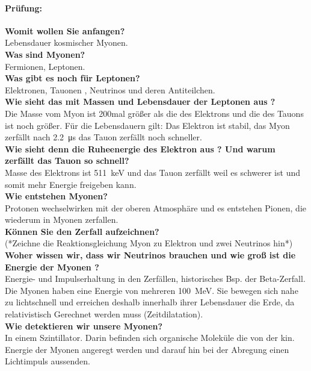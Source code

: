 \paragraph{Prüfung:} \quad \newline
\textbf{Womit wollen Sie anfangen?}\\
Lebensdauer kosmischer Myonen. \\
\textbf{Was sind Myonen?}\\
Fermionen, Leptonen. \\ 
\textbf{Was gibt es noch für Leptonen?}\\
Elektronen, Tauonen , Neutrinos und deren Antiteilchen. \\
\textbf{Wie sieht das mit Massen und Lebensdauer der Leptonen aus ?} \\
Die Masse vom Myon ist 200mal größer als die des Elektrons und die des Tauons ist noch größer.
Für die Lebensdauern gilt: Das Elektron ist stabil, das Myon zerfällt nach \SI{2.2}{\micro\second} 
das Tauon zerfällt noch schneller. \\
\textbf{Wie sieht denn die Ruheenergie des Elektron aus ? Und warum zerfällt das Tauon so schnell?} \\
Masse des Elektrons ist \SI{511}{\kilo\eV} und das Tauon zerfällt weil es schwerer ist und somit 
mehr Energie freigeben kann. \\
\textbf{Wie entstehen Myonen?}\\
Protonen wechselwirken mit der oberen Atmosphäre und es entstehen Pionen, die wiederum in Myonen 
zerfallen. \\
\textbf{Können Sie den Zerfall aufzeichnen?} \\
(*Zeichne die Reaktionsgleichung Myon zu Elektron und zwei Neutrinos hin*) \\
\textbf{Woher wissen wir, dass wir Neutrinos brauchen und wie groß ist die Energie der Myonen ?} \\
Energie- und Impulserhaltung in den Zerfällen, historisches Bsp. der Beta-Zerfall. 
Die Myonen haben eine Energie von mehreren \SI{100}{\mega\eV}. Sie bewegen sich nahe zu lichtschnell
 und erreichen deshalb innerhalb ihrer Lebensdauer die Erde, da relativistisch Gerechnet werden muss 
(Zeitdilatation).\\
\textbf{Wie detektieren wir unsere Myonen?}\\
In einem Szintillator. Darin befinden sich organische Moleküle die von der kin. Energie der 
Myonen angeregt werden und darauf hin  bei der Abregung einen Lichtimpuls aussenden. \\
